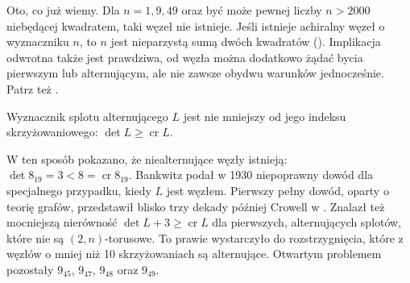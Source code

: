Oto, co już wiemy.
Dla $n = 1, 9, 49$ oraz być może pewnej liczby $n > 2000$ niebędącej kwadratem, taki węzeł nie istnieje.
Jeśli istnieje achiralny węzeł o wyznaczniku $n$, to $n$ jest nieparzystą sumą dwóch kwadratów (\cite{hartley79}).
Implikacja odwrotna także jest prawdziwa, od węzła można dodatkowo żądać bycia pierwszym lub alternującym, ale nie zawsze obydwu warunków jednocześnie.
Patrz też \cite{stoimenow05}.

\begin{proposition} \label{prp:bankwitz}
    Wyznacznik splotu alternującego $L$ jest nie mniejszy od jego indeksu skrzyżowaniowego: $\det L \ge \operatorname{cr} L$.
\end{proposition}

W ten sposób pokazano, że niealternujące węzły istnieją: $\det 8_{19} = 3 < 8 = \operatorname{cr} 8_{19}$.
Bankwitz podał w 1930 niepoprawny dowód dla specjalnego przypadku, kiedy $L$ jest węzłem.
Pierwszy pełny dowód, oparty o teorię grafów, przedstawił blisko trzy dekady później Crowell w \cite{crowell59}.
Znalazł też mocniejszą nierówność $\det L + 3 \ge \operatorname{cr} L$ dla pierwszych, alternujących splotów, które nie są $(2, n)$-torusowe.
To prawie wystarczyło do rozstrzygnięcia, które z węzłów o mniej niż 10 skrzyżowaniach są alternujące.
Otwartym problemem pozostały $9_{45}$, $9_{47}$, $9_{48}$ oraz $9_{49}$.

